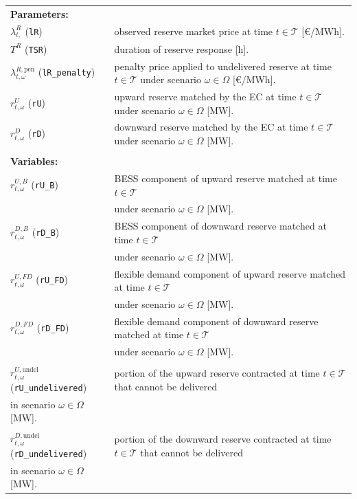 \documentclass{article}
\begin{document}
\begin{tabularx}{\textwidth}{l l}

\textbf{Parameters:} \\
$\lambda^{R}_{t,}$ (\verb|lR|) & observed reserve market price at time $t \in \mathcal{T}$ [\euro/MWh]. \\
$T^R$ (\verb|TSR|) & duration of reserve response [h]. \\
$\lambda^{R,\text{pen}}_{t,\omega}$ (\verb|lR_penalty|) & penalty price applied to undelivered reserve at time $t \in \mathcal{T}$ under scenario $\omega \in \Omega$ [\euro/MWh]. \\    
$r^{U}_{t, \omega}$ (\verb|rU|) & upward reserve matched by the EC at time $t \in \mathcal{T}$ under scenario $\omega \in \Omega$ [MW]. \\
$r^{D}_{t, \omega}$ (\verb|rD|) & downward reserve matched by the EC at time $t \in \mathcal{T}$ under scenario $\omega \in \Omega$ [MW]. \\
\\
\textbf{Variables:} \\
$r^{U, B}_{t, \omega}$ (\verb|rU_B|) & BESS component of upward reserve matched at time $t \in \mathcal{T}$ \\
& under scenario $\omega \in \Omega$ [MW]. \\
$r^{D, B}_{t, \omega}$ (\verb|rD_B|) & BESS component of downward reserve matched at time $t \in \mathcal{T}$ \\
& under scenario $\omega \in \Omega$ [MW]. \\
$r^{U, FD}_{t, \omega}$ (\verb|rU_FD|) & flexible demand component of upward reserve matched at time $t \in \mathcal{T}$ \\
& under scenario $\omega \in \Omega$ [MW]. \\
$r^{D, FD}_{t, \omega}$ (\verb|rD_FD|) & flexible demand component of downward reserve matched at time $t \in \mathcal{T}$ \\
& under scenario $\omega \in \Omega$ [MW]. \\
\\
$r^{U,\text{undel}}_{t,\omega}$ (\verb|rU_undelivered|) & portion of the upward reserve contracted at time $t\in\mathcal{T}$ that cannot be delivered\\ in scenario $\omega\in\Omega$ [MW]. \\
\\
$r^{D,\text{undel}}_{t,\omega}$ (\verb|rD_undelivered|) & portion of the downward reserve contracted at time $t\in\mathcal{T}$ that cannot be delivered\\ in scenario $\omega\in\Omega$ [MW]. \\

\end{tabularx}\\
\end{document}

